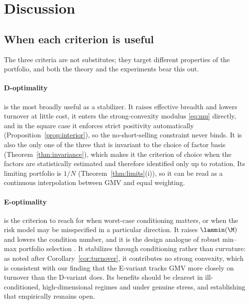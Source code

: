 \section{Discussion}
\label{sec:discussion}

\subsection{When each criterion is useful}
The three criteria are not substitutes; they target different properties of the
portfolio, and both the theory and the experiments bear this out.

\paragraph{D-optimality} is the most broadly useful as a stabilizer. It raises
effective breadth and lowers turnover at little cost, it enters the
strong-convexity modulus \eqref{eq:mu} directly, and in the square case it
enforces strict positivity automatically
(Proposition~\ref{prop:interior}), so the no-short-selling constraint never
binds. It is also the only one of the three that is invariant to the choice of
factor basis (Theorem~\ref{thm:invariance}), which makes it the criterion of
choice when the factors are statistically estimated and therefore identified
only up to rotation. Its limiting portfolio is $1/N$
(Theorem~\ref{thm:limits}(i)), so it can be read as a continuous interpolation
between GMV and equal weighting.

\paragraph{E-optimality} is the criterion to reach for when worst-case
conditioning matters, or when the risk model may be misspecified in a particular
direction. It raises $\lammin(\M)$ and lowers the condition number, and it is the
design analogue of robust min--max portfolio selection \cite{goldfarb2003}. It
stabilizes through conditioning rather than curvature: as noted after
Corollary~\ref{cor:turnover}, it contributes no strong convexity, which is
consistent with our finding that the E-variant tracks GMV more closely on
turnover than the D-variant does. Its benefits should be clearest in
ill-conditioned, high-dimensional regimes and under genuine stress, and
establishing that empirically remains open.

